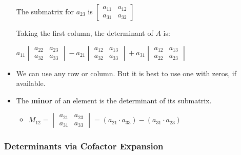 \begin{itemize}
    The submatrix for $a_{23}$ is 
    $\begin{bmatrix}
        a_{11} & a_{12} \\
        a_{31} & a_{32}    
    \end{bmatrix}$ 

    Taking the first column, the determinant of $A$ is:

    $
    a_{11}
    \begin{vmatrix}
        a_{22} & a_{23} \\
        a_{32} & a_{33}    
    \end{vmatrix}
    - a_{21}
    \begin{vmatrix}
        a_{12} & a_{13} \\
        a_{32} & a_{33}
    \end{vmatrix}
    + a_{31}
    \begin{vmatrix}
        a_{12} & a_{13} \\
        a_{22} & a_{23}
    \end{vmatrix}
    $

    \item We can use any row or column. But it is best to use one with zeros, if available. 

    \item The \textbf{minor} of an element is the determinant of its submatrix.
    \begin{itemize}
        \item $M_{12} = 
        \begin{vmatrix}
            a_{21} & a_{23} \\
            a_{31} & a_{33}
        \end{vmatrix}
        =
        (a_{21} \cdot a_{33}) - (a_{31} \cdot a_{23})
        $
    \end{itemize}
\end{itemize}

\subsubsection{Determinants via Cofactor Expansion}

